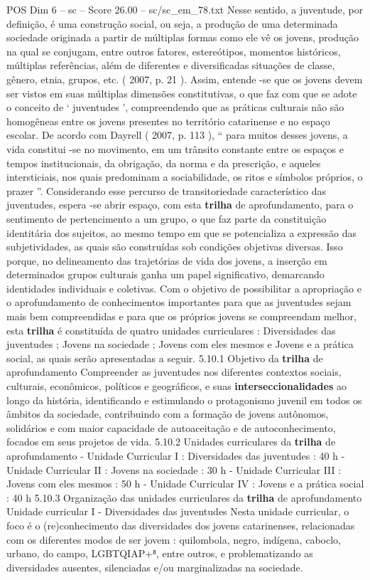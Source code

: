 \begin{textsample}{POS Dim 6 – sc – Score 26.00 – sc/sc\_em\_78.txt}
Nesse sentido, a juventude, por definição, é uma construção social, ou seja, a produção de uma determinada sociedade originada a partir de múltiplas formas como ele vê os jovens, produção na qual se conjugam, entre outros fatores, estereótipos, momentos históricos, múltiplas referências, além de diferentes e diversificadas situações de classe, gênero, etnia, grupos, etc. ( 2007, p. 21 ).
Assim, entende -se que os jovens devem ser vistos em suas múltiplas dimensões constitutivas, o que faz com que se adote o conceito de ‘ juventudes ’, compreendendo que as práticas culturais não são homogêneas entre os jovens presentes no território catarinense e no espaço escolar.
De acordo com Dayrell ( 2007, p. 113 ), “ para muitos desses jovens, a vida constitui -se no movimento, em um trânsito constante entre os espaços e tempos institucionais, da obrigação, da norma e da prescrição, e aqueles intersticiais, nos quais predominam a sociabilidade, os ritos e símbolos próprios, o prazer ”.
Considerando esse percurso de transitoriedade característico das juventudes, espera -se abrir espaço, com esta \textbf{trilha} de aprofundamento, para o sentimento de pertencimento a um grupo, o que faz parte da constituição identitária dos sujeitos, ao mesmo tempo em que se potencializa a expressão das subjetividades, as quais são construídas sob condições objetivas diversas.
Isso porque, no delineamento das trajetórias de vida dos jovens, a inserção em determinados grupos culturais ganha um papel significativo, demarcando identidades individuais e coletivas.
Com o objetivo de possibilitar a apropriação e o aprofundamento de conhecimentos importantes para que as juventudes sejam mais bem compreendidas e para que os próprios jovens se compreendam melhor, esta \textbf{trilha} é constituída de quatro unidades curriculares : Diversidades das juventudes ; Jovens na sociedade ; Jovens com eles mesmos e Jovens e a prática social, as quais serão apresentadas a seguir. 5.10.1 Objetivo da \textbf{trilha} de aprofundamento Compreender as juventudes nos diferentes contextos sociais, culturais, econômicos, políticos e geográficos, e suas \textbf{interseccionalidades} ao longo da história, identificando e estimulando o protagonismo juvenil em todos os âmbitos da sociedade, contribuindo com a formação de jovens autônomos, solidários e com maior capacidade de autoaceitação e de autoconhecimento, focados em seus projetos de vida. 5.10.2 Unidades curriculares da \textbf{trilha} de aprofundamento - Unidade Curricular I : Diversidades das juventudes : 40 h - Unidade Curricular II : Jovens na sociedade : 30 h - Unidade Curricular III : Jovens com eles mesmos : 50 h - Unidade Curricular IV : Jovens e a prática social : 40 h 5.10.3 Organização das unidades curriculares da \textbf{trilha} de aprofundamento Unidade curricular I - Diversidades das juventudes Nesta unidade curricular, o foco é o (re)conhecimento das diversidades dos jovens catarinenses, relacionadas com os diferentes modos de ser jovem : quilombola, negro, indígena, caboclo, urbano, do campo, LGBTQIAP+⁸, entre outros, e problematizando as diversidades ausentes, silenciadas e/ou marginalizadas na sociedade.

\end{textsample}
